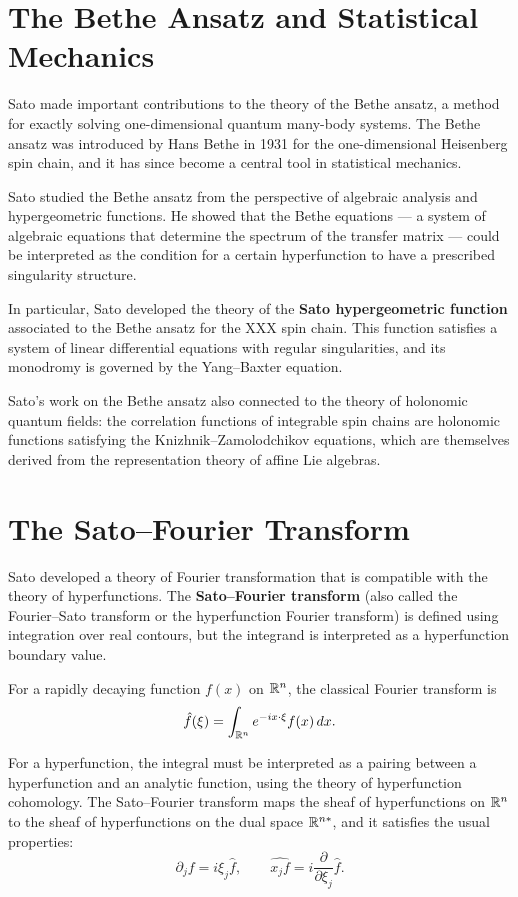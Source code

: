 \section{The Bethe Ansatz and Statistical Mechanics}

Sato made important contributions to the theory of the Bethe ansatz, a method for exactly solving one-dimensional quantum many-body systems. The Bethe ansatz was introduced by Hans Bethe in 1931 for the one-dimensional Heisenberg spin chain, and it has since become a central tool in statistical mechanics.

Sato studied the Bethe ansatz from the perspective of algebraic analysis and hypergeometric functions. He showed that the Bethe equations --- a system of algebraic equations that determine the spectrum of the transfer matrix --- could be interpreted as the condition for a certain hyperfunction to have a prescribed singularity structure.

In particular, Sato developed the theory of the \textbf{Sato hypergeometric function} associated to the Bethe ansatz for the XXX spin chain. This function satisfies a system of linear differential equations with regular singularities, and its monodromy is governed by the Yang--Baxter equation.

Sato's work on the Bethe ansatz also connected to the theory of holonomic quantum fields: the correlation functions of integrable spin chains are holonomic functions satisfying the Knizhnik--Zamolodchikov equations, which are themselves derived from the representation theory of affine Lie algebras.

\section{The Sato--Fourier Transform}

Sato developed a theory of Fourier transformation that is compatible with the theory of hyperfunctions. The \textbf{Sato--Fourier transform} (also called the Fourier--Sato transform or the hyperfunction Fourier transform) is defined using integration over real contours, but the integrand is interpreted as a hyperfunction boundary value.

For a rapidly decaying function \(f(x)\) on \(\mathbb{R}^n\), the classical Fourier transform is
\[
\hat{f}(\xi) = \int_{\mathbb{R}^n} e^{-i x \cdot \xi} f(x) \, dx.
\]

For a hyperfunction, the integral must be interpreted as a pairing between a hyperfunction and an analytic function, using the theory of hyperfunction cohomology. The Sato--Fourier transform maps the sheaf of hyperfunctions on \(\mathbb{R}^n\) to the sheaf of hyperfunctions on the dual space \(\mathbb{R}^{n*}\), and it satisfies the usual properties:
\[
\widehat{\partial_j f} = i\xi_j \hat{f}, \qquad \widehat{x_j f} = i\frac{\partial}{\partial \xi_j} \hat{f}.
\]

